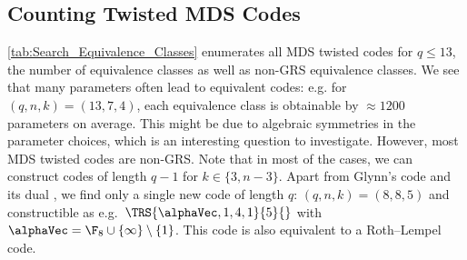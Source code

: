 \documentclass[conference,a4paper]{IEEEtran}
\begin{document}
\subsection{Counting Twisted MDS Codes}

\cref{tab:Search_Equivalence_Classes} enumerates all MDS twisted codes for $q \leq 13$, the number of equivalence classes as well as non-GRS equivalence classes.
We see that many parameters often lead to equivalent codes: e.g. for $(q,n,k)=(13,7,4)$, each equivalence class is obtainable by $\approx\!\!1200$ parameters on average.
This might be due to algebraic symmetries in the parameter choices, which is an interesting question to investigate.
However, most MDS twisted codes are non-GRS.
Note that in most of the cases, we can construct codes of length $q-1$ for $k \in \{3,n-3\}$.
Apart from Glynn's code and its dual \cite{glynn1986non}, we find only a single new code of length $q$: $(q,n,k)=(8,8,5)$ and constructible as e.g.~$\TRS{\alphaVec,1,4,1}{5}{}$ with $\alphaVec = \F_8 \cup \{ \infty \} \setminus \{ 1 \}$.
This code is also equivalent to a Roth--Lempel code.
\end{document}
